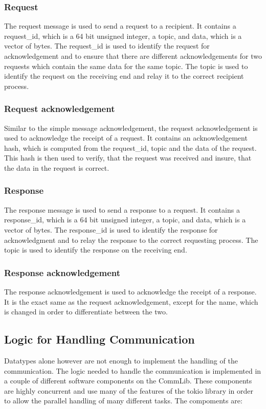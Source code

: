 \subsubsection{Request}
The request message is used to send a request to a recipient. It contains a request\_id, which is a 64 bit unsigned integer, a topic, and data, 
which is a vector of bytes. The request\_id is used to identify the request for acknowledgement and to ensure that there are different acknowledgements 
for two requests which contain the same data for the same topic. The topic is used to identify the request on the receiving end and relay it
to the correct recipient process.

\subsubsection{Request acknowledgement}
Similar to the simple message acknowledgement, the request acknowledgement is used to acknowledge the receipt of a request. It contains an acknowledgement
hash, which is computed from the request\_id, topic and the data of the request. This hash is then used to verify, that the request was received and insure, 
that the data in the request is correct. 

\subsubsection{Response}
The response message is used to send a response to a request. It contains a response\_id, which is a 64 bit unsigned integer, a topic, and data,
which is a vector of bytes. The response\_id is used to identify the response for acknowledgment and to relay the response to the correct requesting
process. The topic is used to identify the response on the receiving end.

\subsubsection{Response acknowledgement}
The response acknowledgement is used to acknowledge the receipt of a response. It is the exact same as the request acknowledgement, except for the 
name, which is changed in order to differentiate between the two.


\subsection{Logic for Handling Communication}
Datatypes alone however are not enough to implement the handling of the communication.
The logic needed to handle the communication is implemented in a couple of different software components on the CommLib.
These components are highly concurrent and use many of the features of the tokio library in order to allow the parallel handling of many different tasks.
The compoments are:

